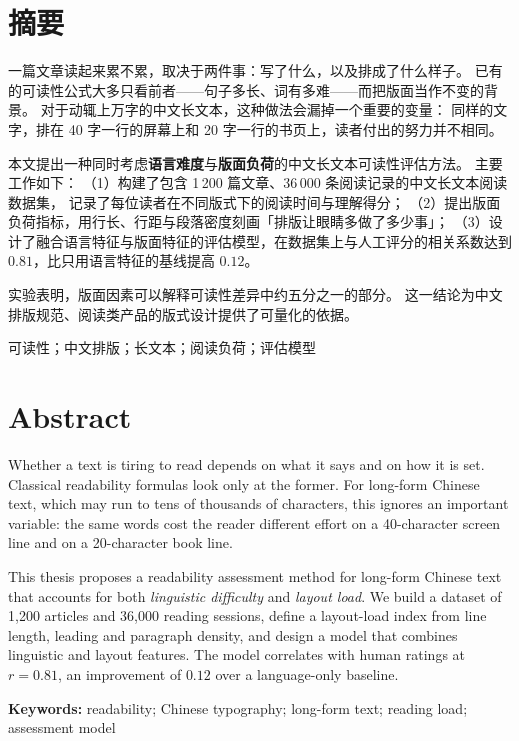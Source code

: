 \chapter{摘\quad 要}

一篇文章读起来累不累，取决于两件事：写了什么，以及排成了什么样子。
已有的可读性公式大多只看前者——句子多长、词有多难——而把版面当作不变的背景。
对于动辄上万字的中文长文本，这种做法会漏掉一个重要的变量：
同样的文字，排在 40 字一行的屏幕上和 20 字一行的书页上，读者付出的努力并不相同。

本文提出一种同时考虑\textbf{语言难度}与\textbf{版面负荷}的中文长文本可读性评估方法。
主要工作如下：
（1）构建了包含 1\,200 篇文章、36\,000 条阅读记录的中文长文本阅读数据集，
记录了每位读者在不同版式下的阅读时间与理解得分；
（2）提出版面负荷指标，用行长、行距与段落密度刻画「排版让眼睛多做了多少事」；
（3）设计了融合语言特征与版面特征的评估模型，在数据集上与人工评分的相关系数达到
$0.81$，比只用语言特征的基线提高 $0.12$。

实验表明，版面因素可以解释可读性差异中约五分之一的部分。
这一结论为中文排版规范、阅读类产品的版式设计提供了可量化的依据。

\vspace{1em}
可读性；中文排版；长文本；阅读负荷；评估模型

\chapter*{Abstract}

Whether a text is tiring to read depends on what it says and on how it is set.
Classical readability formulas look only at the former. For long-form Chinese text,
which may run to tens of thousands of characters, this ignores an important variable:
the same words cost the reader different effort on a 40-character screen line and on
a 20-character book line.

This thesis proposes a readability assessment method for long-form Chinese text that
accounts for both \emph{linguistic difficulty} and \emph{layout load}. We build a
dataset of 1,200 articles and 36,000 reading sessions, define a layout-load index from
line length, leading and paragraph density, and design a model that combines linguistic
and layout features. The model correlates with human ratings at $r = 0.81$, an
improvement of $0.12$ over a language-only baseline.

\vspace{1em}
\noindent\textbf{Keywords:} readability; Chinese typography; long-form text;
reading load; assessment model
